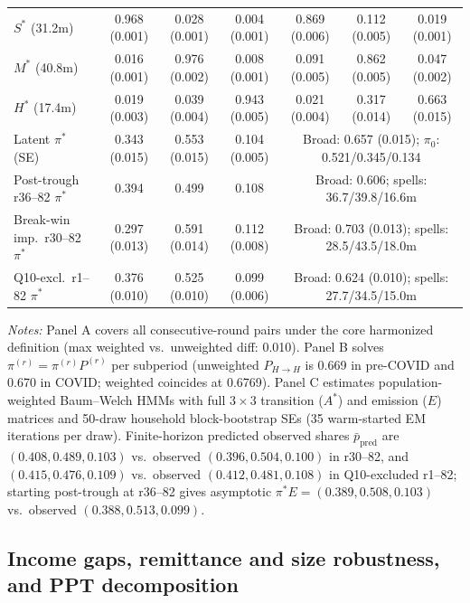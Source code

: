 \documentclass[11pt]{article}
\begin{document}
\begin{table}[tbp]
{\begin{tabular}{lcccccc}
\midrule
$S^*$ (31.2m) & 0.968 (0.001) & 0.028 (0.001) & 0.004 (0.001) & 0.869 (0.006) & 0.112 (0.005) & 0.019 (0.001) \\
$M^*$ (40.8m) & 0.016 (0.001) & 0.976 (0.002) & 0.008 (0.001) & 0.091 (0.005) & 0.862 (0.005) & 0.047 (0.002) \\
$H^*$ (17.4m) & 0.019 (0.003) & 0.039 (0.004) & 0.943 (0.005) & 0.021 (0.004) & 0.317 (0.014) & 0.663 (0.015) \\
\midrule
Latent $\pi^*$ (SE) & 0.343 (0.015) & 0.553 (0.015) & 0.104 (0.005) & \multicolumn{3}{c}{Broad: 0.657 (0.015); $\pi_0$: 0.521/0.345/0.134} \\
Post-trough r36--82 $\pi^*$ & 0.394 & 0.499 & 0.108 & \multicolumn{3}{c}{Broad: 0.606; spells: 36.7/39.8/16.6m} \\
Break-win imp.\ r30--82 $\pi^*$ & 0.297 (0.013) & 0.591 (0.014) & 0.112 (0.008) & \multicolumn{3}{c}{Broad: 0.703 (0.013); spells: 28.5/43.5/18.0m} \\
Q10-excl.\ r1--82 $\pi^*$ & 0.376 (0.010) & 0.525 (0.010) & 0.099 (0.006) & \multicolumn{3}{c}{Broad: 0.624 (0.010); spells: 27.7/34.5/15.0m} \\
\bottomrule
\end{tabular}%
}
\begin{flushleft}
\footnotesize\textit{Notes:} Panel A covers all consecutive-round pairs under the core harmonized definition (max weighted vs.\ unweighted diff: 0.010). Panel B solves $\pi^{(r)} = \pi^{(r)} P^{(r)}$ per subperiod (unweighted $P_{H\to H}$ is 0.669 in pre-COVID and 0.670 in COVID; weighted coincides at 0.6769). Panel C estimates population-weighted Baum--Welch HMMs with full $3\times 3$ transition ($A^*$) and emission ($E$) matrices and 50-draw household block-bootstrap SEs (35 warm-started EM iterations per draw). Finite-horizon predicted observed shares $\bar{p}_{\text{pred}}$ are $(0.408, 0.489, 0.103)$ vs.\ observed $(0.396, 0.504, 0.100)$ in r30--82, and $(0.415, 0.476, 0.109)$ vs.\ observed $(0.412, 0.481, 0.108)$ in Q10-excluded r1--82; starting post-trough at r36--82 gives asymptotic $\pi^* E = (0.389, 0.508, 0.103)$ vs.\ observed $(0.388, 0.513, 0.099)$.
\end{flushleft}
\end{table}

\subsection{Income gaps, remittance and size robustness, and PPT decomposition}\label{sec:income}
\end{document}
